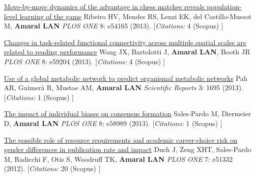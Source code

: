 \NumberedItem{\makebox[0.8cm][r]{[102]}}
\href{/people/amaral/move-move-dynamics-advantage-chess-matches-reveals-population-level-learning-game}
{Move-by-move dynamics of the advantage in chess matches reveals population-level learning of the game}
\newline
Ribeiro HV, Mendes RS, Lenzi EK, del Castillo-Mussot M, {\textbf{Amaral LAN}}
\newline
\textit{PLOS ONE}
    8:
e54165 (2013).
    [{\em{Citations:}}  4 (Scopus) ]
\newline
\Gap
~
\Gap

\NumberedItem{\makebox[0.8cm][r]{[101]}}
\href{/people/amaral/changes-task-related-functional-connectivity-across-multiple-spatial-scales-are-related-reading-performance}
{Changes in task-related functional connectivity across multiple spatial scales are related to reading performance}
\newline
Wang JX, Bartolotti J, {\textbf{Amaral LAN}}, Booth JR
\newline
\textit{PLOS ONE}
    8:
e59204 (2013).
    [{\em{Citations:}}  4 (Scopus) ]
\newline
\Gap
~
\Gap

\NumberedItem{\makebox[0.8cm][r]{[100]}}
\href{/people/amaral/use-global-metabolic-network-predict-organismal-metabolic-networks}
{Use of a global metabolic network to predict organismal metabolic networks}
\newline
Pah AR, Guimer\`a R, Mustoe AM, {\textbf{Amaral LAN}}
\newline
\textit{Scientific Reports}
    3:
1695 (2013).
    [{\em{Citations:}}  1 (Scopus) ]
\newline
\Gap
~
\Gap

\NumberedItem{\makebox[0.8cm][r]{[99]}}
\href{/people/amaral/impact-individual-biases-consensus-formation}
{The impact of individual biases on consensus formation}
\newline
Sales-Pardo M, Diermeier D, {\textbf{Amaral LAN}}
\newline
\textit{PLOS ONE}
    8:
e58989 (2013).
    [{\em{Citations:}}  1 (Scopus) ]
\newline
\Gap
~
\Gap

\NumberedItem{\makebox[0.8cm][r]{[98]}}
\href{/people/amaral/possible-role-resource-requirements-and-academic-career-choice-risk-gender-differences-publication-rate-and-impact}
{The possible role of resource requirements and academic career-choice risk on gender differences in publication rate and impact}
\newline
Duch J, Zeng XHT, Sales-Pardo M, Radicchi F, Otis S, Woodruff TK, {\textbf{Amaral LAN}}
\newline
\textit{PLOS ONE}
    7:
e51332 (2012).
    [{\em{Citations:}}  20 (Scopus) ]
\newline
\Gap
~
\Gap


